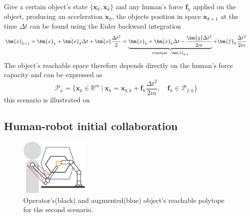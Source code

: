 Give a certain object's state $\{\bm{x}_k,\dot{\bm{x}}_k\}$ and any human's force $\bm{f}_{h}$ applied on the object, producing an acceleration $\ddot{\bm{x}}_{h}$, the objects position in space $\bm{x}_{k+1}$ at the time $\Delta t$ can be found using the Euler backward integration
\begin{equation}
    \bm{x}_{k+1} = \bm{x}_{k} + \dot{\bm{x}}_{k}\Delta t  + \ddot{\bm{x}}\frac{\Delta t^2}{2} \\
    = \underbrace{\bm{x}_k + \dot{\bm{x}}_k\Delta t - \frac{\bm{g} \Delta t^2}{2m}}_{\text{constant}~~\bm{x}_{b,k}}+ \bm{f}_h\frac{\Delta t^2}{2m}
\end{equation}
The object's reachable space therefore depends directly on the human's force capacity and can be expressed as
\begin{equation}
    \mathcal{P}_x = \{\bm{x}_k \in \mathbb{R}^m ~|~ \bm{x}_k = \bm{x}_{b,k} + \bm{f}_h\frac{\Delta t^2}{2m}, \quad\bm{f}_h \in \mathcal{P}_{f,h} \}
\end{equation}
this scenario is illustrated on 




\subsection{Human-robot initial collaboration}
\begin{figure}[htb!]
    \centering
    \includegraphics[width=0.3\textwidth]{Papers/lichie/g2.png}
    \caption{Operator's(black) and augmented(blue) object's reachable polytope for the second scenario.}
    \label{fig:goal2}
\end{figure}

